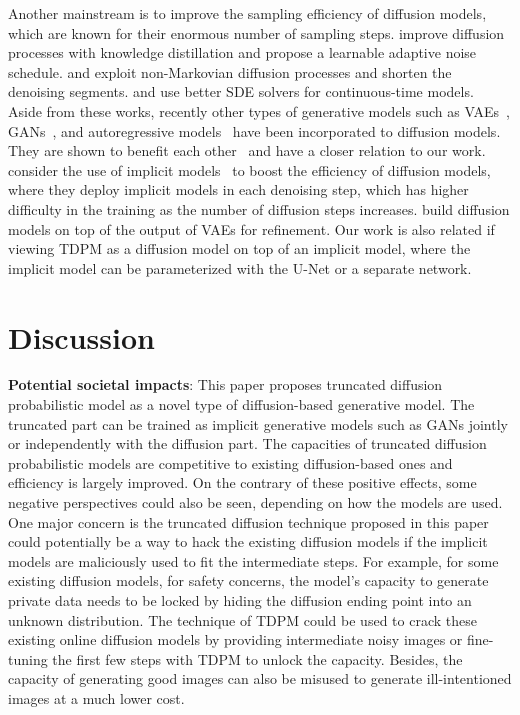 \documentclass{article} \usepackage{iclr2023_conference,times}
\theoremstyle{plain}
\theoremstyle{definition}
\theoremstyle{remark}
\begin{document}
{Another mainstream is to improve the sampling efficiency of  diffusion models, which are known for their enormous number of sampling steps. \citet{luhman2021knowledge} improve diffusion processes with knowledge distillation and \citet{san2021noise} propose a learnable adaptive noise schedule.  \citet{ddim} and \citet{kong2021fast} exploit non-Markovian diffusion processes and shorten the denoising segments. \citet{jolicoeur2021gotta} and \citet{huang2021variational} use better SDE solvers for continuous-time models. Aside from these works, recently other types of generative models such as VAEs~\citep{kingma2013auto}, GANs~\citep{goodfellow2014generative}, and autoregressive models~\citep{pixelcnn} have been incorporated to diffusion models. They are shown to benefit each other~\citep{xiao2021tackling,pandey2022diffusevae,meng2021improved} and have a closer relation to our work. \citet{xiao2021tackling} consider the use of implicit models~\citep{huszar2017variational,mohamed2016learning,tran2017hierarchical,yin2018semi,li2018implicit} to boost the efficiency of diffusion models, where they deploy implicit models in each denoising step, which has higher difficulty in the training as the number of diffusion steps increases. \citet{pandey2022diffusevae} build diffusion models on top of the output of VAEs for refinement. Our work is also related if viewing TDPM as a diffusion model on top of an implicit model, where the implicit model can be parameterized {with the U-Net or a separate network.} 

\section{Discussion}\label{appendix:discussion}
\textbf{Potential societal impacts}: 
This paper proposes truncated diffusion probabilistic model as a novel type of diffusion-based generative model. The truncated part can be trained as implicit generative models such as GANs jointly or independently with the diffusion part. The capacities of truncated diffusion probabilistic models are competitive to existing diffusion-based ones and efficiency is largely improved. On the contrary of these positive effects, some negative perspectives could also be seen, depending on how the models are used. One major concern is the truncated diffusion technique proposed in this paper could potentially be a way to hack the existing diffusion models if the implicit models are maliciously used to fit the intermediate steps. For example, for some existing diffusion models, for safety concerns, the model's capacity to generate private data needs to be locked by hiding the diffusion ending point into an unknown distribution. The technique of TDPM could be used to crack these existing online diffusion models by providing intermediate noisy images or fine-tuning the first few steps with TDPM to unlock the capacity. Besides, the capacity of generating good images can also be misused to generate ill-intentioned images at a much lower cost.

}
\end{document}
